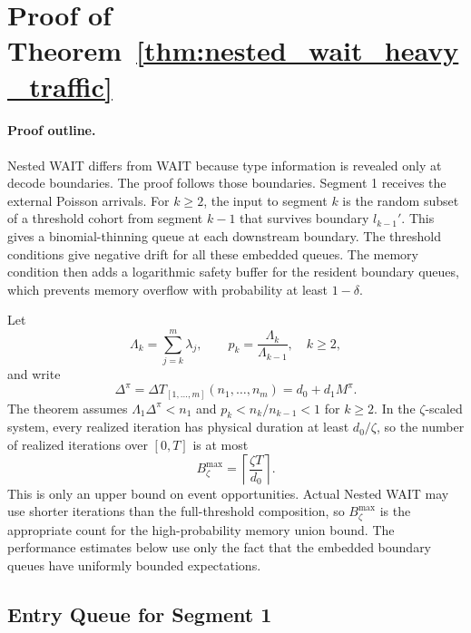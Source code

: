 
\section{Proof of Theorem~\ref{thm:nested_wait_heavy_traffic}}\label{appendix::proof of nested_wait_heavy_traffic}

\paragraph{Proof outline.}
Nested WAIT differs from WAIT because type information is revealed only at decode boundaries. The proof follows those boundaries. Segment 1 receives the external Poisson arrivals. For \(k\ge2\), the input to segment \(k\) is the random subset of a threshold cohort from segment \(k-1\) that survives boundary \(l_{k-1}'\). This gives a binomial-thinning queue at each downstream boundary. The threshold conditions give negative drift for all these embedded queues. The memory condition then adds a logarithmic safety buffer for the resident boundary queues, which prevents memory overflow with probability at least \(1-\delta\).

Let
\[
    \Lambda_k=\sum_{j=k}^m\lambda_j,\qquad
    p_k=\frac{\Lambda_k}{\Lambda_{k-1}},\quad k\ge2,
\]
and write
\[
    \Delta^\pi=\Delta T_{[1,\ldots,m]}(n_1,\ldots,n_m)=d_0+d_1M^\pi.
\]
The theorem assumes \(\Lambda_1\Delta^\pi<n_1\) and \(p_k<n_k/n_{k-1}<1\) for \(k\ge2\). In the \(\zeta\)-scaled system, every realized iteration has physical duration at least \(d_0/\zeta\), so the number of realized iterations over \([0,T]\) is at most
\[
    B_\zeta^{\max}=\left\lceil \frac{\zeta T}{d_0}\right\rceil .
\]
This is only an upper bound on event opportunities. Actual Nested WAIT may use shorter iterations than the full-threshold composition, so \(B_\zeta^{\max}\) is the appropriate count for the high-probability memory union bound. The performance estimates below use only the fact that the embedded boundary queues have uniformly bounded expectations.

\subsection{Entry Queue for Segment 1}

